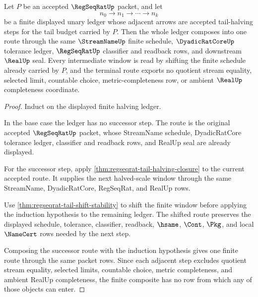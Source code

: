 \begin{theorem}
\label{thm:regseqrat-tail-halving-induction}
Let $P$ be an accepted $\RegSeqRatUp$ packet, and let
$$
n_0 \to n_1 \to \cdots \to n_k
$$
be a finite displayed unary ledger whose adjacent arrows are accepted tail-halving steps for the tail budget carried by $P$. Then the whole ledger composes into one route through the same $\StreamNameUp$ finite schedule, $\DyadicRatCoreUp$ tolerance ledger, $\RegSeqRatUp$ classifier and readback rows, and downstream $\RealUp$ seal. Every intermediate window is read by shifting the finite schedule already carried by $P$, and the terminal route exports no quotient stream equality, selected limit, countable choice, metric-completeness row, or ambient $\RealUp$ completeness coordinate.
\end{theorem}
\begin{proof}
Induct on the displayed finite halving ledger.

In the base case the ledger has no successor step. The route is the original accepted $\RegSeqRatUp$ packet, whose StreamName schedule, DyadicRatCore tolerance ledger, classifier and readback rows, and RealUp seal are already displayed.

For the successor step, apply \autoref{thm:regseqrat-tail-halving-closure} to the current accepted route. It supplies the next halved-scale window through the same StreamName, DyadicRatCore, RegSeqRat, and RealUp rows.

Use \autoref{thm:regseqrat-tail-shift-stability} to shift the finite window before applying the induction hypothesis to the remaining ledger. The shifted route preserves the displayed schedule, tolerance, classifier, readback, $\hsame$, $\Cont$, $\Pkg$, and local $\NameCert$ rows needed by the next step.

Composing the successor route with the induction hypothesis gives one finite route through the same packet rows. Since each adjacent step excludes quotient stream equality, selected limits, countable choice, metric completeness, and ambient RealUp completeness, the finite composite has no row from which any of those objects can enter.
\end{proof}

